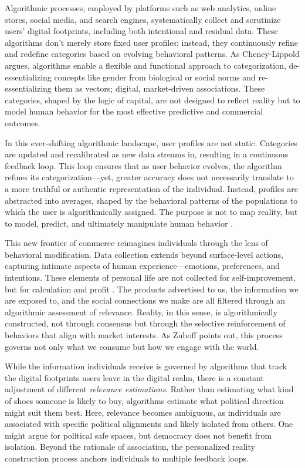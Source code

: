 Algorithmic processes, employed by platforms such as web analytics, online stores, social media, and search engines, systematically collect and scrutinize users' digital footprints, including both intentional and residual data. These algorithms don't merely store fixed user profiles; instead, they continuously refine and redefine categories based on evolving behavioral patterns. As Cheney-Lippold \parencite*[170]{Cheney2011} argues, algorithms enable a flexible and functional approach to categorization, de-essentializing concepts like gender from biological or social norms and re-essentializing them as vectors; digital, market-driven associations. These categories, shaped by the logic of capital, are not designed to reflect reality but to model human behavior for the most effective predictive and commercial outcomes.

In this ever-shifting algorithmic landscape, user profiles are not static. Categories are updated and recalibrated as new data streams in, resulting in a continuous feedback loop. This loop ensures that as user behavior evolves, the algorithm refines its categorization—yet, greater accuracy does not necessarily translate to a more truthful or authentic representation of the individual. Instead, profiles are abstracted into averages, shaped by the behavioral patterns of the populations to which the user is algorithmically assigned. The purpose is not to map reality, but to model, predict, and ultimately manipulate human behavior \parencite[135-145]{Cheney2011}.

This new frontier of commerce reimagines individuals through the lens of behavioral modification. Data collection extends beyond surface-level actions, capturing intimate aspects of human experience—emotions, preferences, and intentions. These elements of personal life are not collected for self-improvement, but for calculation and profit \parencite[331]{zuboff2019}. The products advertised to us, the information we are exposed to, and the social connections we make are all filtered through an algorithmic assessment of relevance. Reality, in this sense, is algorithmically constructed, not through consensus but through the selective reinforcement of behaviors that align with market interests. As Zuboff points out, this process governs not only what we consume but how we engage with the world.

While the information individuals receive is governed by algorithms that track the digital footprints users leave in the digital realm, there is a constant adjustment of different \textit{relevance estimations}. Rather than estimating what kind of shoes someone is likely to buy, algorithms estimate what political direction might suit them best. Here, relevance becomes ambiguous, as individuals are associated with specific political alignments and likely isolated from others. One might argue for political safe spaces, but democracy does not benefit from isolation. Beyond the rationale of association, the personalized reality construction process anchors individuals to multiple feedback loops.

